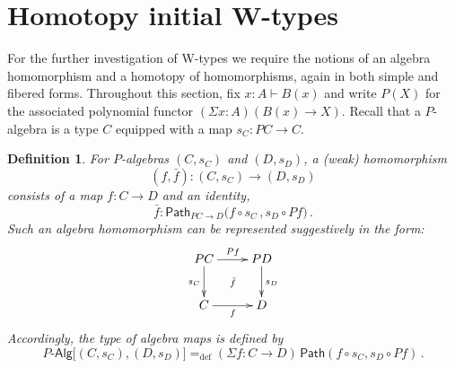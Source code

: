 \documentclass[10pt,a4paper,oneside,reqno]{amsart}
\numberwithin{equation}{section}
\theoremstyle{mythm}
\theoremstyle{mydef}
\newtheorem{definition}[theorem]{Definition}
\theoremstyle{myrmk}
\newcommand{\defeq}{=_{\mathrm{def}}}
\newcommand{\prd}[1]{\Pi_{#1}}
\newcommand{\lam}[1]{\lambda_{#1}}
\newcommand{\Id}{\mathsf{Path}}
\newcommand{\id}[1]{\Id_{#1}}
\newcommand{\W}{\mathsf{W}}
\newcommand{\wsup}{\mathsf{sup}}
\newcommand{\UU}{\mathsf{U}}
\newcommand{\Palg}{P\text{-}\mathsf{Alg}}
\begin{document}
%



\section{Homotopy initial W-types}

For the further investigation of W-types we require the notions of an algebra homomorphism and a homotopy of homomorphisms, again in both simple and fibered forms.  Throughout this section, fix $x:A\vdash B(x)$ and write $P(X)$ for the associated polynomial functor $(\Sigma x : A) (B(x) \rightarrow X)$.  Recall that a $P$-algebra is a type $C$ equipped with a map
$s_C :  PC \rightarrow C$.  

\begin{definition}
For $P$-algebras $(C,s_C)$ and $(D,s_D)$, a \emph{(weak) 
homomorphism}  $$(f, \bar{f}) : (C, s_C) \rightarrow (D, s_D)$$
consists of a map $f : C \rightarrow D$ and an identity,
\[
\bar{f} : \id{PC \rightarrow D}\big( f \circ s_C \, ,  s_{D} \circ Pf \big) \, .
\]
Such an algebra homomorphism can be represented suggestively in the form:
\[
\xymatrix{
 PC \ar[d]_{s_C} \ar[r]^{Pf}  \ar@{}[dr]|{\bar{f}} &  PD \ar[d]^{s_D}\\
C \ar[r]_{f}   & D }
\] 
Accordingly, the type of algebra maps is defined by
\[
\Palg
\big[ (C,s_C), (D, s_D)  \big]
 \defeq  
(\Sigma f:  C \rightarrow D) \, \Id(f\circ s_C, s_D\circ Pf) \, .
\]
\end{definition}
\medskip
\end{document}
